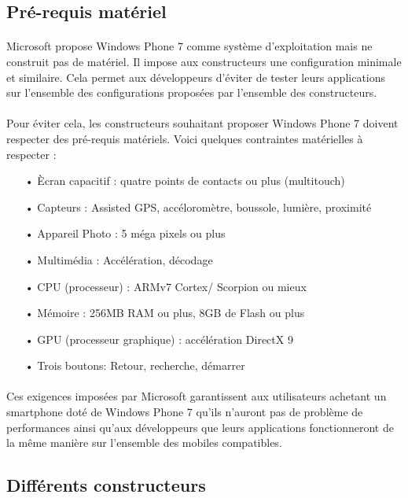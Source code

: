 \documentclass[twoside,UTF8]{EPURapport}
\begin{document}
	\subsection{Pré-requis matériel}
\paragraph{}
Microsoft propose Windows Phone 7 comme système d'exploitation mais ne construit pas de matériel. Il impose aux constructeurs une configuration minimale et similaire. Cela permet aux développeurs d'éviter de tester leurs applications sur l'ensemble des configurations proposées par l'ensemble des constructeurs. 
\paragraph{}
Pour éviter cela, les constructeurs souhaitant proposer Windows Phone 7 doivent respecter des pré-requis matériels. 
Voici quelques contraintes matérielles à respecter : 
\begin{itemize}
	\item[•]\`Ecran capacitif : quatre points de contacts ou plus (multitouch)
	\item[•]Capteurs : Assisted GPS, accéloromètre, boussole, lumière, proximité
	\item[•]Appareil Photo : 5 méga pixels ou plus
	\item[•]Multimédia : Accélération, décodage
	\item[•]CPU (processeur) : ARMv7 Cortex/ Scorpion ou mieux
	\item[•]Mémoire : 256MB RAM ou plus, 8GB de Flash ou plus
	\item[•]GPU (processeur graphique) : accélération DirectX 9
	\item[•]Trois boutons: Retour, recherche, démarrer
\end{itemize}

\paragraph{}
Ces exigences imposées par Microsoft garantissent aux utilisateurs achetant un smartphone doté de Windows Phone 7 qu'ils n'auront pas de problème de performances ainsi qu'aux développeurs que leurs applications fonctionneront de la même manière sur l'ensemble des mobiles compatibles. 

	\subsection{Différents constructeurs}
\end{document}
